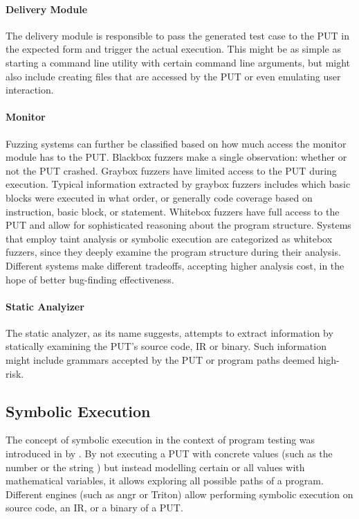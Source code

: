 \documentclass{article}
\begin{document}
\begin{multicols}{2}
  \paragraph{Delivery Module}
  The delivery module is responsible to pass the generated test case to the PUT in the expected form and trigger the actual execution. This might be as simple as starting a command line utility with certain command line arguments, but might also include creating files that are accessed by the PUT or even emulating user interaction.

  \paragraph{Monitor}
  Fuzzing systems can further be classified based on how much access the monitor module has to the PUT. Blackbox fuzzers make a single observation: whether or not the PUT crashed. Graybox fuzzers have limited access to the PUT during execution. Typical information extracted by graybox fuzzers includes which basic blocks were executed in what order, or generally code coverage based on instruction, basic block, or statement. Whitebox fuzzers have full access to the PUT and allow for sophisticated reasoning about the program structure. Systems that employ taint analysis or symbolic execution are categorized as whitebox fuzzers, since they deeply examine the program structure during their analysis. Different systems make different tradeoffs, accepting higher analysis cost, in the hope of better bug-finding effectiveness.\cite{EvaluatingFuzzTesting}

  \paragraph{Static Analyizer}
  The static analyzer, as its name suggests, attempts to extract information by statically examining the PUT's source code, IR or binary. Such information might include grammars accepted by the PUT or program paths deemed high-risk.

  \subsection{Symbolic Execution}
  \label{SymbolicExecution}
  The concept of symbolic execution in the context of program testing was introduced in \citeyear{Symbex} by \citeauthor{Symbex}.\cite{Symbex} By not executing a PUT with concrete values (such as the number  or the string ) but instead modelling certain or all values with mathematical variables, it allows exploring all possible paths of a program. Different engines (such as angr\cite{angr} or Triton\cite{Triton}) allow performing symbolic execution on source code, an IR, or a binary of a PUT.


\end{multicols}
\end{document}
